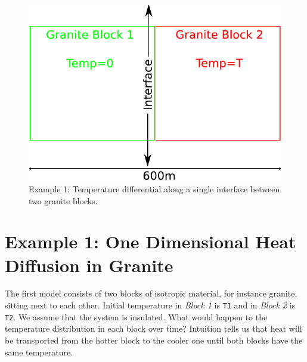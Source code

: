 
%
%
%

\begin{figure}[h!]
\centerline{\includegraphics[width=4.in]{figures/onedheatdiff001}}
\caption{Example 1: Temperature differential along a single interface between two granite blocks.}
\label{fig:onedgbmodel}
\end{figure}

\section{Example 1: One Dimensional Heat Diffusion in Granite}
\label{Sec:1DHDv00}

The first model consists of two blocks of isotropic material, for instance granite, sitting next to each other.
Initial temperature in \textit{Block 1} is \verb|T1| and in \textit{Block 2} is \verb|T2|.
We assume that the system is insulated.
What would happen to the temperature distribution in each block over time? 
Intuition tells us that heat will be transported from the hotter block to the cooler one until both
blocks have the same temperature.

